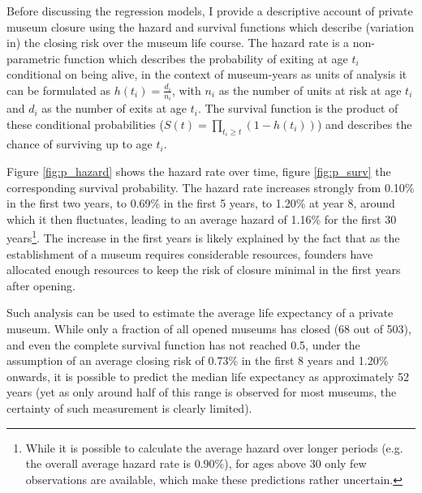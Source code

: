 \documentclass[12pt]{article}
\begin{document}
Before discussing the regression models, I provide a descriptive account of private museum closure using the hazard and survival functions which describe (variation in) the closing risk over the museum life course.
The hazard rate is a non-parametric function which describes the probability of exiting at age \(t_i\) conditional on being alive, in the context of museum-years as units of analysis it can be formulated as \(h(t_i) = \frac{d_i}{n_i}\), with \(n_i\) as the number of units at risk at age \(t_i\) and \(d_i\) as the number of exits at age \(t_i\).
The survival function is the product of these conditional probabilities (\(S(t) = \prod_{t_i \geq t} \left(1-h(t_i) \right)\)) and describes the chance of surviving up to age \(t_i\). 


Figure \ref{fig:p_hazard} shows the hazard rate over time, figure \ref{fig:p_surv} the corresponding survival probability.
The hazard rate increases strongly from 0.10\% in the first two years, to 0.69\% in the first 5 years, to 1.20\% at year 8, around which it then fluctuates, leading to an average hazard of 1.16\% for the first 30 years\footnote{While it is possible to calculate the average hazard over longer periods (e.g. the overall average hazard rate is 0.90\%), for ages above 30 only few observations are available, which make these predictions rather uncertain.}.
The increase in the first years is likely explained by the fact that as the establishment of a museum requires considerable resources, founders have allocated enough resources to keep the risk of closure minimal in the first years after opening.

Such analysis can be used to estimate the average life expectancy of a private museum.
While only a fraction of all opened museums has closed (68 out of 503), and even the complete survival function has not reached 0.5, under the assumption of an average closing risk of 0.73\% in the first 8 years and 1.20\% onwards, it is possible to predict the median life expectancy as approximately 52 years (yet as only around half of this range is observed for most museums, the certainty of such measurement is clearly limited).
\end{document}
